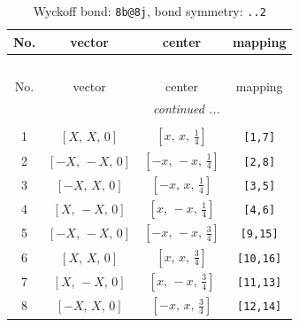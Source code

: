 \documentclass[fleqn,8pt]{jsarticle}
\begin{document}
\begin{longtable}{cccc}
\caption{Wyckoff bond: {\tt 8b@8j}, bond symmetry: {\tt ..2}}
 \\
 \hline \hline
No. & vector & center & mapping \\ \hline \endfirsthead

\multicolumn{3}{l}{\tablename\ \thetable{}} \\
 \hline \hline
No. & vector & center & mapping \\ \hline \endhead

 \hline \hline
\multicolumn{3}{r}{\footnotesize\it continued ...} \\ \endfoot

 \hline \hline
\multicolumn{3}{r}{} \\ \endlastfoot

1 & $\left[ X,\, X,\, 0 \right]$ & $\left[ x,\, x,\, \frac{1}{4} \right]$ & {\tt [1,7]} \\ \hline
2 & $\left[ - X,\, - X,\, 0 \right]$ & $\left[ - x,\, - x,\, \frac{1}{4} \right]$ & {\tt [2,8]} \\ \hline
3 & $\left[ - X,\, X,\, 0 \right]$ & $\left[ - x,\, x,\, \frac{1}{4} \right]$ & {\tt [3,5]} \\ \hline
4 & $\left[ X,\, - X,\, 0 \right]$ & $\left[ x,\, - x,\, \frac{1}{4} \right]$ & {\tt [4,6]} \\ \hline
5 & $\left[ - X,\, - X,\, 0 \right]$ & $\left[ - x,\, - x,\, \frac{3}{4} \right]$ & {\tt [9,15]} \\ \hline
6 & $\left[ X,\, X,\, 0 \right]$ & $\left[ x,\, x,\, \frac{3}{4} \right]$ & {\tt [10,16]} \\ \hline
7 & $\left[ X,\, - X,\, 0 \right]$ & $\left[ x,\, - x,\, \frac{3}{4} \right]$ & {\tt [11,13]} \\ \hline
8 & $\left[ - X,\, X,\, 0 \right]$ & $\left[ - x,\, x,\, \frac{3}{4} \right]$ & {\tt [12,14]} \\
\end{longtable}
\renewcommand{\arraystretch}{1.2}
\end{document}
